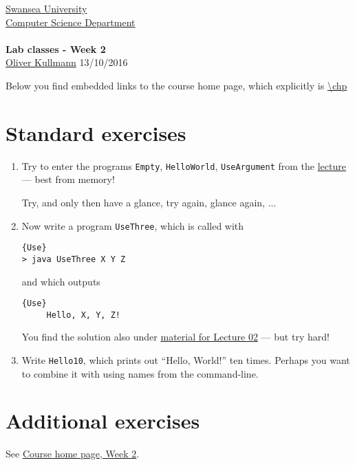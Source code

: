 \documentclass[11pt]{article}
\newcommand{\Java}{\lstset{language=Java,keywordstyle=\bfseries,breaklines,breakindent=30pt}}
\begin{document}
\begin{center}
  \href{http://www.swan.ac.uk/}{Swansea University}\\
  \href{http://www.swan.ac.uk/compsci/}{Computer Science Department}\\[1ex]
  \href{\chp}{\module}\\[1ex]
  \textbf{Lab classes - Week 2}\\
  \href{http://cs.swan.ac.uk/~csoliver}{Oliver Kullmann} 13/10/2016
\end{center}

Below you find embedded links to the course home page, which explicitly is \url{\chp}

\section{Standard exercises}
\label{sec:stdex}

\Java

\begin{enumerate}
\item Try to enter the programs \texttt{Empty}, \texttt{HelloWorld}, \texttt{UseArgument} from the \href{\chp\#LecturesWeek02}{lecture} --- best from memory!
  \begin{center}
    Try, and only then have a glance, try again, glance again, ...
  \end{center}
\item Now write a program \texttt{UseThree}, which is called with
  \begin{lstlisting}{Use}
> java UseThree X Y Z
  \end{lstlisting}
   and which outputs
   \begin{lstlisting}{Use}
     Hello, X, Y, Z!
   \end{lstlisting}
   You find the solution also under \href{\chp\#LecturesWeek02}{material for Lecture 02} --- but try hard!
 \item Write \texttt{Hello10}, which prints out ``Hello, World!'' ten times. Perhaps you want to combine it with using names from the command-line.
\end{enumerate}


\section{Additional exercises}
\label{sec:addex}

See \href{\chp\#ExercisesWeek02}{Course home page, Week 2}.
\end{document}
